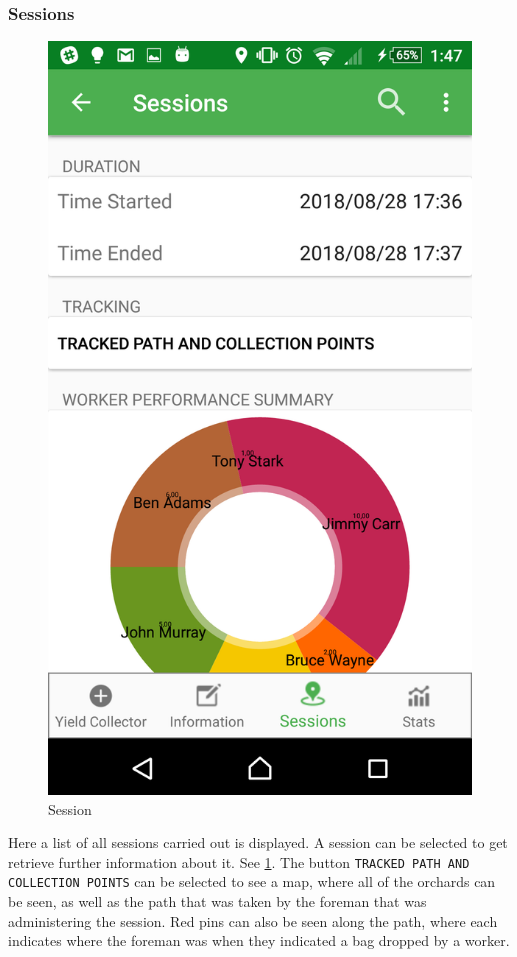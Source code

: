 \documentclass[11pt]{article}
\begin{document}
\subsubsection{Sessions}
\label{Mobile Sessions}

\begin{figure}
 \centering
 \includegraphics[width=12cm, keepaspectratio]{Images/mobileSession.png}
 \caption{Session}
 \label{Mobile Session}
\end{figure}

Here a list of all sessions carried out is displayed. A session can be selected to get retrieve further information about it. See \ref{Mobile Session}. The button \texttt{TRACKED PATH AND COLLECTION POINTS} can be selected to see a map, where all of the orchards can be seen, as well as the path that was taken by the foreman that was administering the session. Red pins can also be seen along the path, where each indicates where the foreman was when they indicated a bag dropped by a worker.
\end{document}
